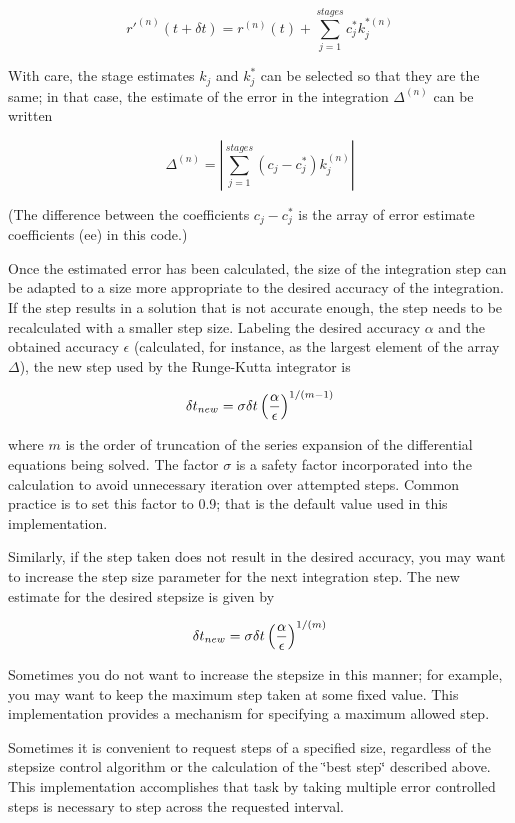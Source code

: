 \[r'^{(n)}(t+\delta t) = r^{(n)}(t) + \sum_{j=1}^{stages}c_j^* k_j^{*(n)}\]

With care, the stage estimates $k_j$ and $k_j^*$ can be selected
so  that they are the same; in that case, the estimate of the
error in the  integration $\Delta^{(n)}$ can be written

\[ \Delta^{(n)} = \left| \sum_{j=1}^{stages}(c_j - c_j^*) k_j^{(n)} \right| \]

(The difference between the coefficients $c_j - c_j^*$ is the
array of  error estimate coefficients (ee) in this code.)

Once the estimated error has been calculated, the size of the
integration  step can be adapted to a size more appropriate to the
desired accuracy of the  integration. If the step results in a
solution that is not accurate enough, the step needs to be
recalculated with a smaller step size. Labeling the desired
accuracy $\alpha$ and the obtained accuracy $\epsilon$
(calculated, for instance, as the largest element of the array
$\Delta$), the new step used by the Runge-Kutta integrator is

\[\delta t_{new}= \sigma\delta t\left({{\alpha}\over{\epsilon}}\right)^{1/(m-1)}\]

where $m$ is the order of truncation of the series expansion of
the  differential equations being solved. The factor $\sigma$ is a
safety  factor incorporated into the calculation to avoid
unnecessary iteration over attempted steps. Common practice is to
set this factor to 0.9; that is the default value used in this
implementation.

Similarly, if the step taken does not result in the desired
accuracy, you may  want to increase the step size parameter for
the next integration step. The  new estimate for the desired
stepsize is given by

\[\delta t_{new}= \sigma\delta t\left({{\alpha}\over{\epsilon}}\right)^{1/(m)}\]

Sometimes you do not want to increase the stepsize in this manner;
for example,  you may want to keep the maximum step taken at some
fixed value. This  implementation provides a mechanism for
specifying a maximum allowed step.

Sometimes it is convenient to request steps of a specified size,
regardless  of the stepsize control algorithm or the calculation
of the \char`\"{}best step\char`\"{}  described above. This
implementation accomplishes that task by taking  multiple error
controlled steps is necessary to step across the requested
interval.

